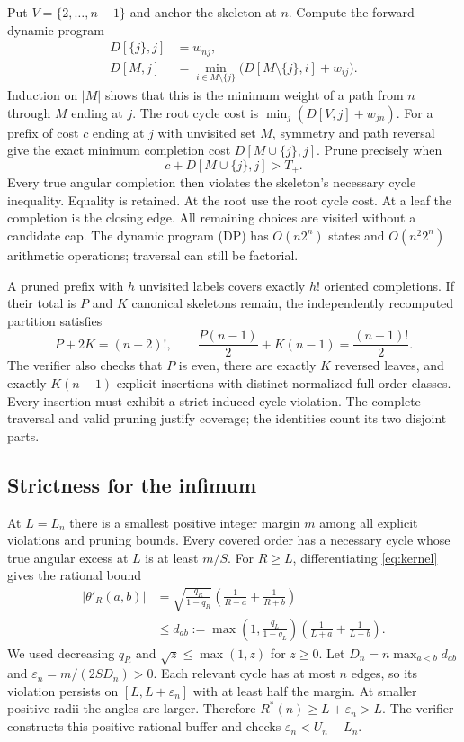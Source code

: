 \documentclass[11pt]{article}
\theoremstyle{definition}
\theoremstyle{remark}
\newcommand{\Rstar}{R^*}
\begin{document}
Put $V=\{2,\ldots,n-1\}$ and anchor the skeleton at $n$. Compute the
forward dynamic program
\begin{align}
 D[\{j\},j]&=w_{nj},\nonumber\\
 D[M,j]&=\min_{i\in M\setminus\{j\}}
           \bigl(D[M\setminus\{j\},i]+w_{ij}\bigr).
 \label{eq:dp}
\end{align}
Induction on $|M|$ shows that this is the minimum weight of a path from
$n$ through $M$ ending at $j$. The root cycle cost is
$\min_j(D[V,j]+w_{jn})$. For a prefix of cost $c$ ending at $j$ with
unvisited set $M$, symmetry and path reversal give the exact minimum
completion cost $D[M\cup\{j\},j]$. Prune precisely when
\begin{equation}\label{eq:prune}
 c+D[M\cup\{j\},j]>T_+.
\end{equation}
Every true angular completion then violates the skeleton's necessary cycle
inequality. Equality is retained. At the root use the root cycle cost.
At a leaf the completion is the closing edge. All remaining choices are
visited without a candidate cap. The dynamic program (DP) has
$O(n2^n)$ states and
$O(n^2 2^n)$ arithmetic operations; traversal can still be factorial.

A pruned prefix with $h$ unvisited labels covers exactly $h!$ oriented
completions. If their total is $P$ and $K$ canonical skeletons remain,
the independently recomputed partition satisfies
\begin{equation}\label{eq:coverage}
 P+2K=(n-2)!,\qquad
 \frac{P(n-1)}2+K(n-1)=\frac{(n-1)!}2.
\end{equation}
The verifier also checks that $P$ is even, there are exactly $K$ reversed
leaves, and exactly $K(n-1)$ explicit insertions with distinct normalized
full-order classes. Every insertion must exhibit a strict induced-cycle
violation. The complete traversal and valid pruning justify coverage;
the identities count its two disjoint parts.

\subsection{Strictness for the infimum}\label{sec:strict}
At $L=L_n$ there is a smallest positive integer margin $m$ among all explicit
violations and pruning bounds. Every covered order has a necessary cycle
whose true angular excess at $L$ is at least $m/S$.
For $R\ge L$, differentiating \eqref{eq:kernel} gives the rational bound
\begin{align*}
 |\theta'_R(a,b)|
 &=\sqrt{\frac{q_R}{1-q_R}}
          \left(\frac1{R+a}+\frac1{R+b}\right)\\
 &\le d_{ab}:=\max\!\left(1,\frac{q_L}{1-q_L}\right)
          \left(\frac1{L+a}+\frac1{L+b}\right).
\end{align*}
We used decreasing $q_R$ and $\sqrt z\le\max(1,z)$ for $z\ge0$.
Let $D_n=n\max_{a<b}d_{ab}$ and
$\varepsilon_n=m/(2SD_n)>0$. Each relevant cycle has at most $n$
edges, so its violation persists on $[L,L+\varepsilon_n]$ with at
least half the margin. At smaller positive radii the angles are larger.
Therefore $\Rstar(n)\ge L+\varepsilon_n>L$. The verifier constructs
this positive rational buffer and checks $\varepsilon_n<U_n-L_n$.
\end{document}
